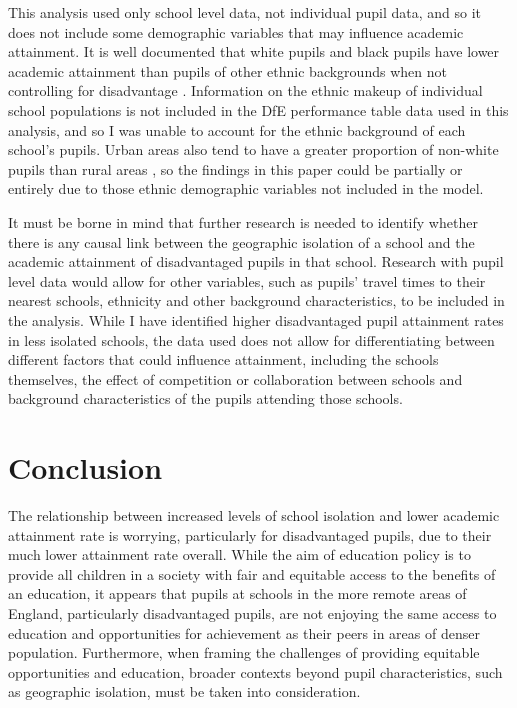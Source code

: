 \documentclass[12pt, a4paper]{article}
\begin{document}
This analysis used only school level data, not individual pupil data, and so it does not include some demographic variables that may influence academic attainment. It is well documented that white pupils and black pupils have lower academic attainment than pupils of other ethnic backgrounds when not controlling for disadvantage \autocites{departmentforeducation2014b, departmentforeducation2015b, departmentforeducation2016}. Information on the ethnic makeup of individual school populations is not included in the DfE performance table data used in this analysis, and so I was unable to account for the ethnic background of each school's pupils. Urban areas also tend to have a greater proportion of non-white pupils than rural areas \autocites{officefornationalstatistics2013}, so the findings in this paper could be partially or entirely due to those ethnic demographic variables not included in the model.

It must be borne in mind that further research is needed to identify whether there is any causal link between the geographic isolation of a school and the academic attainment of disadvantaged pupils in that school. Research with pupil level data would allow for other variables, such as pupils' travel times to their nearest schools, ethnicity and other background characteristics, to be included in the analysis. While I have identified higher disadvantaged pupil attainment rates in less isolated schools, the data used does not allow for differentiating between different factors that could influence attainment, including the schools themselves, the effect of competition or collaboration between schools and background characteristics of the pupils attending those schools.

\section{Conclusion}

The relationship between increased levels of school isolation and lower academic attainment rate is worrying, particularly for disadvantaged pupils, due to their much lower attainment rate overall. While the aim of education policy is to provide all children in a society with fair and equitable access to the benefits of an education, it appears that pupils at schools in the more remote areas of England, particularly disadvantaged pupils, are not enjoying the same access to education and opportunities for achievement as their peers in areas of denser population. Furthermore, when framing the challenges of providing equitable opportunities and education, broader contexts beyond pupil characteristics, such as geographic isolation, must be taken into consideration.
\end{document}
